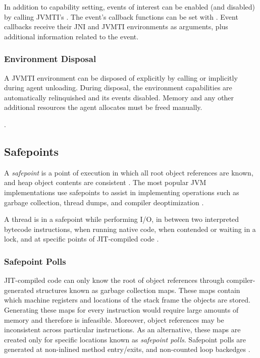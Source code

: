 In addition to capability setting, events of interest can be enabled (and disabled) by calling JVMTI's . The event's callback functions can be set with . Event callbacks receive their JNI and JVMTI environments as arguments, plus additional information related to the event.

\subsubsection*{Environment Disposal}

A JVMTI environment can be disposed of explicitly by calling  or implicitly during agent unloading. During disposal, the environment capabilities are automatically relinquished and its events disabled. Memory and any other additional resources the agent allocates must be freed manually.

.

\subsection{Safepoints}

A \emph{safepoint} is a point of execution in which all root object references are known, and heap object contents are consistent \cite{hotspotglossary}. The most popular JVM implementations use safepoints to assist in implementing operations such as garbage collection, thread dumps, and compiler deoptimization \cite{lin2015yieldpoint}.

A thread is in a safepoint while performing I/O, in between two interpreted bytecode instructions, when running native code, when contended or waiting in a lock, and at specific points of JIT-compiled code \cite{wakart2015safepoints}.

\subsubsection*{Safepoint Polls}

JIT-compiled code can only know the root of object references through compiler-generated structures known as garbage collection maps. These maps contain which machine registers and locations of the stack frame the objects are stored. Generating these maps for every instruction would require large amounts of memory and therefore is infeasible. Moreover, object references may be inconsistent across particular instructions. As an alternative, these maps are created only for specific locations known as \emph{safepoint polls}. Safepoint polls are generated at non-inlined method entry/exits, and non-counted loop backedges \cite{hohenseehotspot}.


